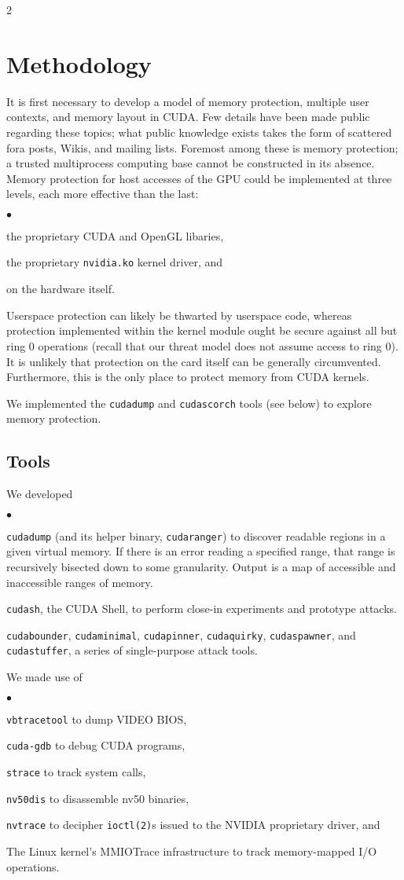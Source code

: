 \documentclass[letterpaper,10pt]{article}
\newcommand{\squishlist}{\begin{list}{$\bullet$}
  {\setlength{\itemsep}{0pt}
    \setlength{\parsep}{3pt}
    \setlength{\topsep}{3pt}
    \setlength{\partopsep}{0pt}
    \setlength{\leftmargin}{1.5em}
    \setlength{\labelwidth}{1em}
    \setlength{\labelsep}{0.5em}
  } }
\newcommand{\squishend}{\end{list}}
\begin{document}
\begin{multicols}{2}
\section{Methodology}
It is first necessary to develop a model of memory protection, multiple user
contexts, and memory layout in CUDA. Few details have been made public
regarding these topics; what public knowledge exists takes the form of
scattered fora posts, Wikis\cite{nouveaucuda}, and mailing lists. Foremost among these is memory
protection; a trusted multiprocess computing base cannot be constructed in its
absence. Memory protection for host accesses of the GPU could be implemented at
three levels, each more effective than the last:
\squishlist
\item the proprietary CUDA and OpenGL libaries,
\item the proprietary \texttt{nvidia.ko} kernel driver, and
\item on the hardware itself.
\squishend
Userspace protection can likely be thwarted by userspace code, whereas
protection implemented within the kernel module ought be secure against
all but ring 0 operations (recall that our threat model does not assume access
to ring 0). It is unlikely that protection on the card itself can be generally
circumvented. Furthermore, this is the only place to protect memory from CUDA
kernels.

We implemented the \texttt{cudadump} and
\texttt{cudascorch} tools (see below)%
to explore memory protection.

\subsection{Tools}
We developed
\squishlist
\item \texttt{cudadump} (and its helper binary, \texttt{cudaranger}) to
discover readable regions in a given virtual memory. If there is an error
reading a specified range, that range is recursively bisected down to some
granularity. Output is a map of accessible and inaccessible ranges of memory.
\item \texttt{cudash}, the CUDA Shell, to perform close-in experiments and
prototype attacks.
\item \texttt{cudabounder}, \texttt{cudaminimal}, \texttt{cudapinner}, \texttt{cudaquirky},
\texttt{cudaspawner}, and \texttt{cudastuffer}, a series of single-purpose attack tools.
\squishend
We made use of
\squishlist
\item \texttt{vbtracetool}\cite{vbtrace} to dump VIDEO BIOS,
\item \texttt{cuda-gdb}\cite{cudagdb} to debug CUDA programs,
\item \texttt{strace}\cite{stracecode} to track system calls,
\item \texttt{nv50dis}\cite{nv50dis} to disassemble nv50 binaries,
\item \texttt{nvtrace}\cite{nvtrace} to decipher \texttt{ioctl(2)}s
issued to the NVIDIA proprietary driver, and
\item The Linux kernel's MMIOTrace\cite{mmiotrace}
infrastructure to track memory-mapped I/O operations.
\squishend


\end{multicols}
\end{document}
